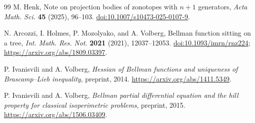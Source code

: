 \documentclass[11pt]{article}
\theoremstyle{remark}
\begin{document}
\begin{thebibliography}{99}
M. Henk, Note on projection bodies of zonotopes with $n+1$ generators, \emph{Acta Math. Sci.} \textbf{45} (2025), 96--103.
\href{https://doi.org/10.1007/s10473-025-0107-9}{doi:10.1007/s10473-025-0107-9}.

N. Arcozzi, I. Holmes, P. Mozolyako, and A. Volberg, Bellman function sitting on a tree, \emph{Int. Math. Res. Not.} \textbf{2021} (2021), 12037--12053.
\href{https://doi.org/10.1093/imrn/rnz224}{doi:10.1093/imrn/rnz224}; \url{https://arxiv.org/abs/1809.03397}.

P. Ivanisvili and A. Volberg, \emph{Hessian of Bellman functions and uniqueness of Brascamp--Lieb inequality}, preprint, 2014.
\url{https://arxiv.org/abs/1411.5349}.

P. Ivanisvili and A. Volberg, \emph{Bellman partial differential equation and the hill property for classical isoperimetric problems}, preprint, 2015.
\url{https://arxiv.org/abs/1506.03409}.
\end{thebibliography}
\end{document}
